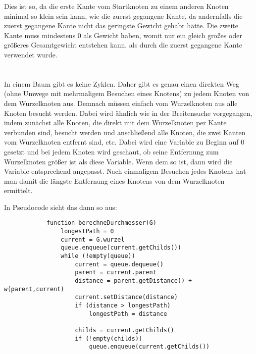 \documentclass[10pt,a4paper,oneside,ngerman,numbers=noenddot]{scrartcl}
\begin{document}
	Dies ist so, da die erste Kante vom Startknoten zu einem anderen Knoten minimal so klein sein kann, wie die zuerst gegangene Kante, da andernfalls die zuerst gegangene Kante nicht das geringste Gewicht gehabt hätte. Die zweite Kante muss mindestens 0 als Gewicht haben, womit nur ein gleich großes oder größeres Gesamtgewicht entstehen kann, als durch die zuerst gegangene Kante verwendet wurde.
\section{} %
	\subsection{} %
		In einem Baum gibt es keine Zyklen. Daher gibt es genau einen direkten Weg (ohne Umwege mit mehrmaligem Besuchen eines Knotens) zu jedem Knoten von dem Wurzelknoten aus. Demnach müssen einfach vom Wurzelknoten aus alle Knoten besucht werden. Dabei wird ähnlich wie in der Breitensuche vorgegangen, indem zunächst alle Knoten, die direkt mit dem Wurzelknoten per Kante verbunden sind, besucht werden und anschließend alle Knoten, die zwei Kanten vom Wurzelknoten entfernt sind, etc. Dabei wird eine Variable zu Beginn auf 0 gesetzt und bei jedem Knoten wird geschaut, ob seine Entfernung zum Wurzelknoten größer ist als diese Variable. Wenn dem so ist, dann wird die Variable entsprechend angepasst. Nach einmaligem Besuchen jedes Knotens hat man damit die längste Entfernung eines Knotens von dem Wurzelknoten ermittelt.
		
		In Pseudocode sieht das dann so aus:
		
		\begin{verbatim}
		    function berechneDurchmesser(G)
		        longestPath = 0
		        current = G.wurzel
		        queue.enqueue(current.getChilds())
		        while (!empty(queue))
		            current = queue.dequeue()
		   	        parent = current.parent
		   	        distance = parent.getDistance() + w(parent,current)
		   	        current.setDistance(distance)
		            if (distance > longestPath)
		                longestPath = distance
		            
		            childs = current.getChilds()
		            if (!empty(childs))
		                queue.enqueue(current.getChilds())
		\end{verbatim}
	\subsection{} %
		
\section{} %
	\subsection{} %
	\subsection{} %
\section{} %
\end{document}
